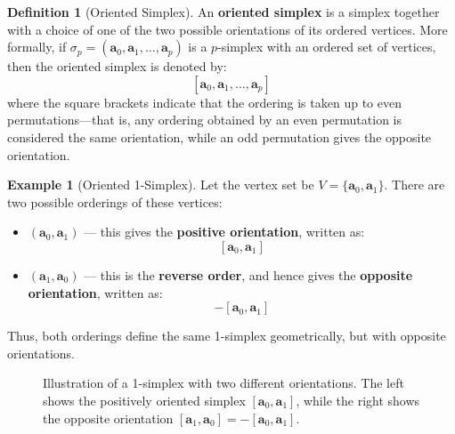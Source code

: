 \documentclass[12pt,oneside,reqno]{amsart}
\theoremstyle{plain}
\theoremstyle{definition}
\newtheorem{example}{Example}[section]
\newtheorem{definition}[theorem]{Definition}
\theoremstyle{remark}
\newcommand{\0}{{\textbf{0}}}
\begin{document}
\begin{definition}[Oriented Simplex]\label{d:Oriented Simplex}
An \textbf{oriented simplex} is a simplex together with a choice of one of the two possible orientations of its ordered vertices. More formally, if $\sigma_p = (\mathbf{a}_0, \mathbf{a}_1, \ldots, \mathbf{a}_p)$ is a $p$-simplex with an ordered set of vertices, then the oriented simplex is denoted by:
\[
[\mathbf{a}_0, \mathbf{a}_1, \ldots, \mathbf{a}_p]
\]
where the square brackets indicate that the ordering is taken up to even permutations—that is, any ordering obtained by an even permutation is considered the same orientation, while an odd permutation gives the opposite orientation.
\end{definition}

\begin{example}[Oriented 1-Simplex]\label{eg:Oriented 1-Simplex}
Let the vertex set be $V = \{\mathbf{a}_0, \mathbf{a}_1\}$. There are two possible orderings of these vertices:
\begin{itemize}
  \item $(\mathbf{a}_0, \mathbf{a}_1)$ — this gives the \textbf{positive orientation}, written as:
  \[
  [\mathbf{a}_0, \mathbf{a}_1]
  \]
  \item $(\mathbf{a}_1, \mathbf{a}_0)$ — this is the \textbf{reverse order}, and hence gives the \textbf{opposite orientation}, written as:
  \[
  -[\mathbf{a}_0, \mathbf{a}_1]
  \]
\end{itemize}
Thus, both orderings define the same 1-simplex geometrically, but with opposite orientations.

\begin{figure}[h!]
\centering
{}
\caption{Illustration of a 1-simplex with two different orientations. The left shows the positively oriented simplex $[\mathbf{a}_0, \mathbf{a}_1]$, while the right shows the opposite orientation $[\mathbf{a}_1, \mathbf{a}_0] = -[\mathbf{a}_0, \mathbf{a}_1]$.}
\label{fig:oriented-1-simplex}
\end{figure}
\end{example}
\end{document}
